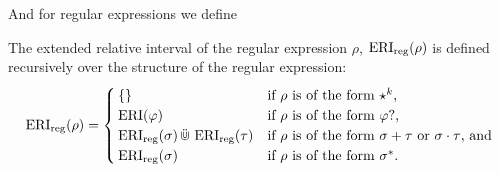 And for regular expressions we define 
\begin{definition}
    \label{def:e-rel-int-reg}
    The extended relative interval of the regular expression $\rho$, $\operatorname{ERI}_{\text{reg}}(\rho)$ is defined recursively over the structure of the regular expression:
    \begin{equation*}
        \operatorname{ERI}_{\text{reg}}(\rho) =
        \begin{cases}
            \{\} & \text{if $\rho$ is of the form $\star^k$,} \\
            \operatorname{ERI}(\varphi) & \text{if $\rho$ is of the form $\varphi ?$,} \\
            \operatorname{ERI}_{\text{reg}}(\sigma) \,\ddot{\Cup}\, \operatorname{ERI}_{\text{reg}}(\tau) & \text{if $\rho$ is of the form $\sigma + \tau$ or $\sigma \cdot \tau$, and} \\
            \operatorname{ERI}_{\text{reg}}(\sigma) & \text{if $\rho$ is of the form $\sigma^*$.}
        \end{cases}
    \end{equation*}
\end{definition}

    


